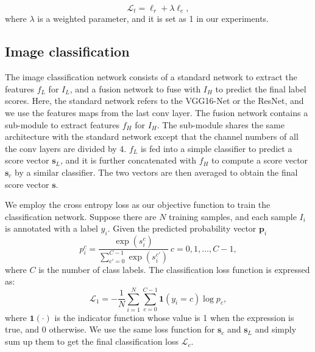 \documentclass[letterpaper]{article} %
\begin{document}
\begin{equation}
   \mathcal{L}_t=\ell_r+\lambda\ell_e,
\end{equation}
where $\lambda$ is a weighted parameter, and it is set as 1 in our experiments.

\subsection{Image classification}
The image classification network consists of a standard network to extract the features $f_L$ for $I_L$, and a fusion network to fuse with $I_H$ to predict the final label scores. Here, the standard network refers to the VGG16-Net or the ResNet, and we use the features maps from the last conv layer. The fusion network contains a sub-module to extract features $f_H$ for $I_H$. The sub-module shares the same architecture with the standard network except that the channel numbers of all the conv layers are divided by 4. $f_L$ is fed into a simple classifier to predict a score vector $\mathbf{s}_L$, and it is further concatenated with $f_H$ to compute a score vector $\mathbf{s}_c$ by a similar classifier. The two vectors are then averaged to obtain the final score vector $\mathbf{s}$.

We employ the cross entropy loss as our objective function to train the classification network. Suppose there are $N$ training samples, and each sample $I_i$ is annotated with a label $y_i$.
Given the predicted probability vector $\mathbf{p}_i$
 \begin{equation}
      p_{i}^c= \frac{\exp(s_{i}^c)}{\sum_{c'=0}^{C-1}\exp(s_{i}^{c'})} \ c=0,1,\dots,C-1,
\end{equation}
where $C$ is the number of class labels. The classification loss function is expressed as:
 \begin{equation}
      \mathcal{L}_{{1}}=-\frac{1}{N}\sum_{i=1}^N\sum_{c=0}^{C-1}\mathbf{1}(y_i=c)\log{p_c},
\end{equation}
where $\mathbf{1}(\cdot)$ is the indicator function whose value is 1 when the expression is true, and 0 otherwise. We use the same loss function for $\mathbf{s}_c$ and $\mathbf{s}_L$ and simply sum up them to get the final classification loss $\mathcal{L}_c$.
\end{document}
